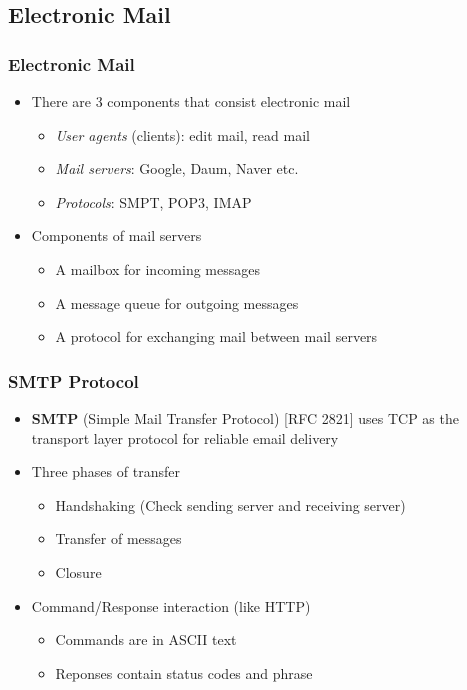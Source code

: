 \subsection{Electronic Mail}
\subsubsection{Electronic Mail}
\begin{itemize}
	\item There are 3 components that consist electronic mail
	\begin{itemize}
		\item \textit{User agents} (clients): edit mail, read mail
		\item \textit{Mail servers}: Google, Daum, Naver etc.
		\item \textit{Protocols}: SMPT, POP3, IMAP
	\end{itemize}
	\item Components of mail servers
	\begin{itemize}
		\item A mailbox for incoming messages
		\item A message queue for outgoing messages
		\item A protocol for exchanging mail between mail servers
	\end{itemize}
\end{itemize}

\subsubsection{SMTP Protocol}
\begin{itemize}
	\item \textbf{SMTP} (Simple Mail Transfer Protocol) [RFC 2821] uses TCP as the transport layer protocol for reliable email delivery
	\item Three phases of transfer
	\begin{itemize}
		\item Handshaking (Check sending server and receiving server)
		\item Transfer of messages
		\item Closure
	\end{itemize}
	\item Command/Response interaction (like HTTP)
	\begin{itemize}
		\item Commands are in ASCII text
		\item Reponses contain status codes and phrase
	\end{itemize}
\end{itemize}

